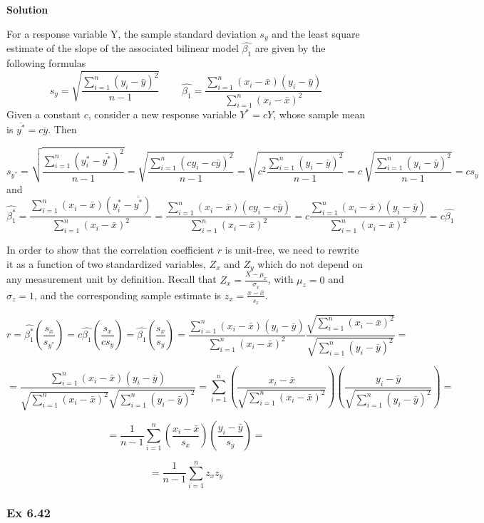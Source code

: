 \documentclass[
]{article}
\begin{document}
\textbf{Solution}

For a response variable Y, the sample standard deviation \(s_y\) and the
least square estimate of the slope of the associated bilinear model
\(\hat{\beta_1}\) are given by the following formulas \[
s_y= \sqrt{\frac{\sum_{i=1}^n (y_i - \bar{y})^2}{n-1}} \ \ \ \ \ \ \ \ \ \ \hat{\beta_1}=\frac{\sum_{i=1}^n (x_i - \bar{x})(y_i - \bar{y})}{\sum_{i=1}^n (x_i - \bar{x})^2}
\] Given a constant \(c\), consider a new response variable \(Y^*=cY\),
whose sample mean is \(\overline{y^*}=c\overline{y}\). Then

\[
s_{y^*}=\sqrt{\frac{\sum_{i=1}^n (y_i^* - \bar{y^*})^2}{n-1}} = 
\sqrt{\frac{\sum_{i=1}^n (cy_i - c\bar{y})^2}{n-1}}=
\sqrt{c^2 \frac {\sum_{i=1}^n(y_i - \bar{y})^2}{n-1}}= 
c \ \sqrt{\frac{\sum_{i=1}^n (y_i - \bar{y})^2}{n-1}} = c s_y
\] and \[
\hat{\beta^*_1}=\frac{\sum_{i=1}^n (x_i - \bar{x})(y_i^* - \bar{y^*})}{\sum_{i=1}^n (x_i - \bar{x})^2}=
\frac{\sum_{i=1}^n (x_i - \bar{x})(cy_i - c\bar{y})}{\sum_{i=1}^n (x_i - \bar{x})^2}=
c \frac{\sum_{i=1}^n (x_i - \bar{x})(y_i - \bar{y})}{\sum_{i=1}^n (x_i - \bar{x})^2} = c \hat{\beta_1}
\]

In order to show that the correlation coefficient \(r\) is unit-free, we
need to rewrite it as a function of two standardized variables, \(Z_x\)
and \(Z_y\) which do not depend on any measurement unit by definition.
Recall that \(Z_x=\frac{X - \mu_x}{\sigma_x}\), with \(\mu_z=0\) and
\(\sigma_z=1\), and the corresponding sample estimate is
\(z_x=\frac{x-\bar{x}}{s_x}\).

\[
r= \hat{\beta^*_1}\left(\frac{s_x}{s_{y^*}}\right)= 
c \hat{\beta_1} \left(\frac{s_x}{cs_{y}}\right) = 
\hat{\beta_1} \left(\frac{s_x}{s_{y}}\right) = 
\frac{\sum_{i=1}^n (x_i - \bar{x})(y_i - \bar{y})}{\sum_{i=1}^n (x_i - \bar{x})^2} \frac{\sqrt{\sum_{i=1}^n (x_i - \bar{x})^2}}{\sqrt{\sum_{i=1}^n (y_i - \bar{y})^2}}=
\]

\[
=\frac{\sum_{i=1}^n (x_i - \bar{x})(y_i - \bar{y})}{\sqrt{\sum_{i=1}^n (x_i - \bar{x})^2}\sqrt{\sum_{i=1}^n (y_i - \bar{y})^2}} =
\sum_{i=1}^n \left(\frac{x_i - \bar{x}}{\sqrt{\sum_{i=1}^n (x_i - \bar{x})^2}}\right)\left(\frac{y_i - \bar{y}}{\sqrt{\sum_{i=1}^n (y_i - \bar{y})^2}}\right)=
\]

\[
=\frac{1}{n-1}\sum_{i=1}^n \left(\frac{x_i - \bar{x}}{s_x}\right)\left(\frac{y_i - \bar{y}}{s_y}\right)=
\]

\[ 
=\frac{1}{n-1}\sum_{i=1}^n z_xz_y
\]

\hypertarget{ex-6.42}{%
\subsubsection{Ex 6.42}\label{ex-6.42}}
\end{document}
